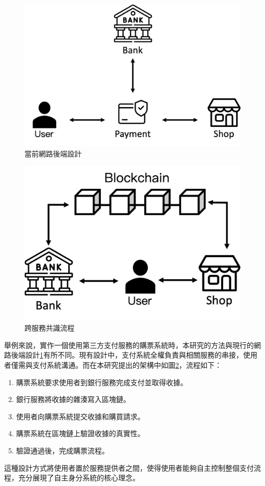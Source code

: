 \begin{figure}
  \centering
  \includegraphics[width=\linewidth,keepaspectratio]{figures/flow-3-part-0.png}
  \caption{當前網路後端設計}
  \label{fig:flow-3-part-0}
\end{figure}
\begin{figure}
  \centering
  \includegraphics[width=\linewidth,keepaspectratio]{figures/flow-3-part.png}
  \caption{跨服務共識流程}
  \label{fig:flow-3-part}
\end{figure}
舉例來說，實作一個使用第三方支付服務的購票系統時，本研究的方法與現行的網路後端設計\ref{fig:flow-3-part-0}有所不同。現有設計中，支付系統全權負責與相關服務的串接，使用者僅需與支付系統溝通。而在本研究提出的架構中如圖\ref{fig:flow-3-part}，流程如下：
\begin{enumerate}
  \item 購票系統要求使用者到銀行服務完成支付並取得收據。
  \item 銀行服務將收據的雜湊寫入區塊鏈。
  \item 使用者向購票系統提交收據和購買請求。
  \item 購票系統在區塊鏈上驗證收據的真實性。
  \item 驗證通過後，完成購票流程。
\end{enumerate}
這種設計方式將使用者置於服務提供者之間，使得使用者能夠自主控制整個支付流程，充分展現了自主身分系統的核心理念。

